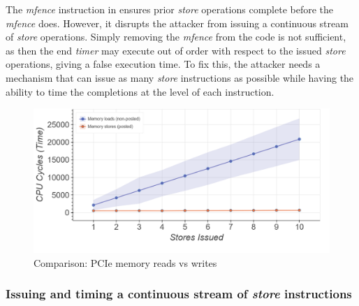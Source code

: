 The \textit{mfence} instruction in  ensures prior \textit{store} operations complete before the \textit{mfence} does.
However, it disrupts the attacker from issuing a continuous stream of \textit{store} operations.
Simply removing the \textit{mfence} from the code is not sufficient, as then the end \textit{timer} may execute out of order with respect to the issued \textit{store} operations, giving a false execution time.
To fix this, the attacker needs a mechanism that can issue as many \textit{store} instructions as possible while having the ability to time the completions at the level of each instruction.

\begin{figure}[!htb]
    \centering
    \includegraphics[width=\columnwidth]{figures/interconnect-sc/store-ops/pcie_mem_reads_v_writes.png}
    \caption{Comparison: PCIe memory reads vs writes}
    \label{fig:pcie-mem-reads-v-writes}
\end{figure}

\begin{minipage}{\textwidth}
    
    \captionsetup{type=lstlisting}
    \caption{Profiling the execution time of \textit{load/store} instruction.
    Each \textit{load} or \textit{store} instruction is issued on a unique memory address which is more than 64 bytes from the previous address.}
    \label{lst:pcie-mem-reads-v-writes}
\end{minipage}

\subsubsection{Issuing and timing a continuous stream of \textit{store} instructions}
\label{subsubsec:interconnect-sc-store-ops-challenges-measuring-time}


